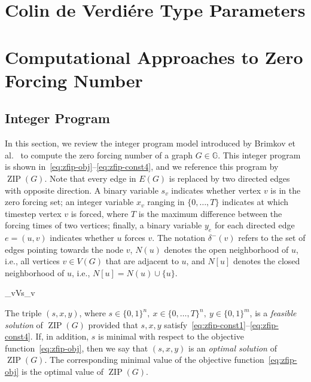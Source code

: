 \documentclass{article}
\theoremstyle{definition}
\newcommand\zip[1]{\operatorname{ZIP}\left(#1\right)}
\begin{document}
\section{Colin de Verdi{\'e}re Type Parameters}

\section{Computational Approaches to Zero Forcing Number}

\subsection{Integer Program}
In this section, we review the integer program model introduced by Brimkov et al.~\cite{Brimkov2019} to compute the zero forcing number of a graph $G\in\mathbb{G}$.
This integer program is shown in~\eqref{eq:zfip-obj}--\eqref{eq:zfip-const4}, and we reference this program by $\zip{G}$.
Note that every edge in $E(G)$ is replaced by two directed edges with opposite direction.
A binary variable $s_{v}$ indicates whether vertex $v$ is in the zero forcing set; an integer variable $x_{v}$ ranging in $\{0,\ldots,T\}$ indicates at which timestep vertex $v$ is forced, where $T$ is the maximum difference between the forcing times of two vertices; finally, a binary variable $y_{e}$ for each directed edge $e = (u,v)$ indicates whether $u$ forces $v$.
The notation $\delta^{-}(v)$ refers to the set of edges pointing towards the node $v$, $N(u)$ denotes the open neighborhood of $u$, i.e., all vertices $v\in V(G)$ that are adjacent to $u$, and $N[u]$ denotes the closed neighborhood of $u$, i.e., $N[u] = N(u)\cup\{u\}$.
\begin{mini!}
	{}{\sum_{v\in V}s_{v}}{}{}\label{eq:zfip-obj}
	\label{eq:zfip-const1}
	\label{eq:zfip-const2}
	\label{eq:zfip-const3}
	\label{eq:zfip-const4}
\end{mini!}
The triple $(s,x,y)$, where $s\in\{0,1\}^{n},~x\in\{0,\ldots,T\}^{n},~y\in\{0,1\}^{m}$, is a \emph{feasible solution} of $\zip{G}$ provided that $s,x,y$ satisfy~\eqref{eq:zfip-const1}--\eqref{eq:zfip-const4}.
If, in addition, $s$ is minimal with respect to the objective function~\ref{eq:zfip-obj}, then we say that $(s,x,y)$ is an \emph{optimal solution} of $\zip{G}$.
The corresponding minimal value of the objective function~\ref{eq:zfip-obj} is the optimal value of $\zip{G}$.
\end{document}
